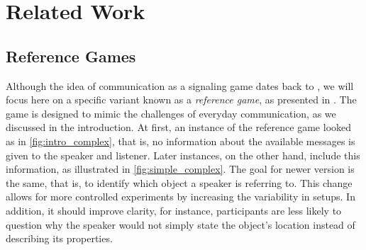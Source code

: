 ﻿\chapter{Related Work}
\section{Reference Games}
Although the idea of communication as a signaling game dates back to \cite{Lewis_1969}, we will focus here on a specific variant known as a \textit{reference game}, as presented in \cite{Frank_2012}. The game is designed to mimic the challenges of everyday communication, as we discussed in the introduction. At first, an instance of the reference game looked as in \autoref{fig:intro_complex}, that is, no information about the available messages is given to the speaker and listener. Later instances, on the other hand, include this information, as illustrated in \autoref{fig:simple_complex}. The goal for newer version is the same, that is, to identify which object a speaker is referring to. This change allows for more controlled experiments by increasing the variability in setups. In addition, it should improve clarity, for instance, participants are less likely to question why the speaker would not simply state the object's location instead of describing its properties.


